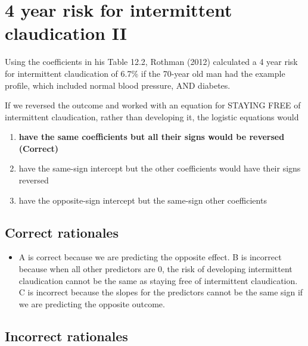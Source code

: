 \documentclass[letterpaper,9pt,twoside,]{pinp}
\providecommand{\tightlist}{%
  \setlength{\itemsep}{0pt}\setlength{\parskip}{0pt}}
\begin{document}
\hypertarget{year-risk-for-intermittent-claudication-ii}{%
\section{4 year risk for intermittent claudication
II}\label{year-risk-for-intermittent-claudication-ii}}

Using the coefficients in his Table 12.2, Rothman (2012) calculated a 4
year risk for intermittent claudication of 6.7\% if the 70-year old man
had the example profile, which included normal blood pressure, AND
diabetes.

If we reversed the outcome and worked with an equation for STAYING FREE
of intermittent claudication, rather than developing it, the logistic
equations would

\begin{enumerate}
\def\labelenumi{\alph{enumi}.}
\tightlist
\item
  \textbf{have the same coefficients but all their signs would be
  reversed (Correct)}
\item
  have the same-sign intercept but the other coefficients would have
  their signs reversed
\item
  have the opposite-sign intercept but the same-sign other coefficients
\end{enumerate}

\hypertarget{correct-rationales-8}{%
\subsection{Correct rationales}\label{correct-rationales-8}}

\begin{itemize}
\tightlist
\item
  A is correct because we are predicting the opposite effect. B is
  incorrect because when all other predictors are 0, the risk of
  developing intermittent claudication cannot be the same as staying
  free of intermittent claudication. C is incorrect because the slopes
  for the predictors cannot be the same sign if we are predicting the
  opposite outcome.
\end{itemize}

\hypertarget{incorrect-rationales-8}{%
\subsection{Incorrect rationales}\label{incorrect-rationales-8}}





\end{document}
